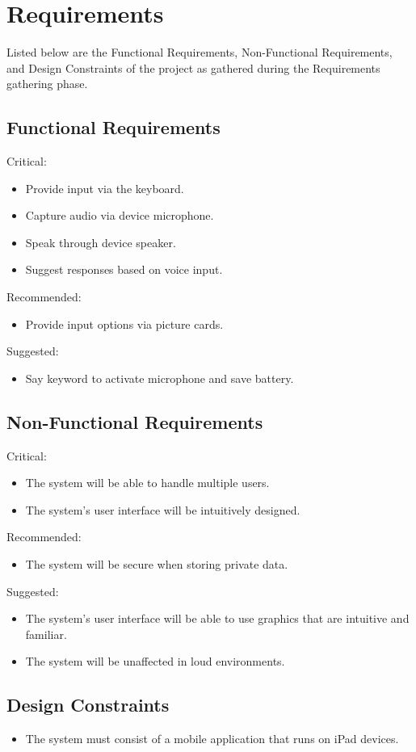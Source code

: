 \chapter{Requirements}

Listed below are the Functional Requirements, Non-Functional Requirements, and Design Constraints of the project as gathered during the Requirements gathering phase.

\section{Functional Requirements}
Critical:
\begin{itemize}
\item Provide input via the keyboard.
\item Capture audio via device microphone.
\item Speak through device speaker.
\item Suggest responses based on voice input.

\end{itemize}
Recommended:
\begin{itemize}
\item Provide input options via picture cards.
\end{itemize}
Suggested:
\begin{itemize}
\item Say keyword to activate microphone and save battery.
\end{itemize}

\section{Non-Functional Requirements}
Critical:
\begin{itemize}
\item The system will be able to handle multiple users.
\item The system's user interface will be intuitively designed.
\end{itemize}
Recommended:
\begin{itemize}
\item The system will be secure when storing private data.
\end{itemize}
Suggested:
\begin{itemize}
\item The system's user interface will be able to use graphics that are intuitive and familiar.
\item The system will be unaffected in loud environments.
\end{itemize}

\section{Design Constraints}
\begin{itemize}
\item The system must consist of a mobile application that runs on iPad devices.
\end{itemize}
